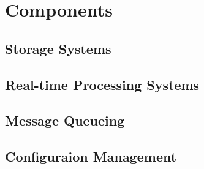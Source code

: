 \chapter{Components}
\label{chap:components}

\section{Storage Systems}





\section{Real-time Processing Systems}




\section{Message Queueing}






\section{Configuraion Management}

